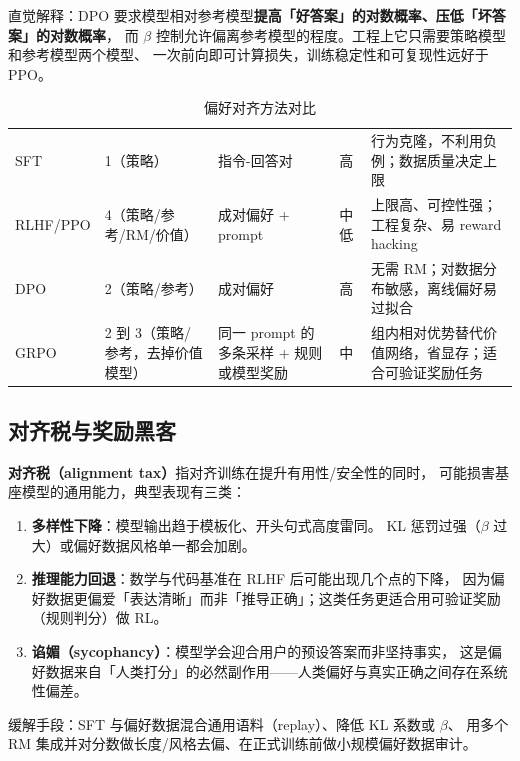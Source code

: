 直觉解释：DPO 要求模型相对参考模型\textbf{提高「好答案」的对数概率、压低「坏答案」的对数概率}，
而 $\beta$ 控制允许偏离参考模型的程度。工程上它只需要策略模型和参考模型两个模型、
一次前向即可计算损失，训练稳定性和可复现性远好于 PPO。

\begin{table}[htbp]
\centering
\caption{偏好对齐方法对比}
\label{tab:alignment-compare}
\small
\begin{tabularx}{\textwidth}{L{1.7cm} L{2.3cm} L{1.8cm} L{1.7cm} Y}
\toprule
{} &  &  &  &  \\
\midrule
SFT & 1（策略） & 指令-回答对 & 高 & 行为克隆，不利用负例；数据质量决定上限 \\
\addlinespace
RLHF/PPO & 4（策略/参考/RM/价值） & 成对偏好 + prompt & 中低 & 上限高、可控性强；工程复杂、易 reward hacking \\
\addlinespace
DPO & 2（策略/参考） & 成对偏好 & 高 & 无需 RM；对数据分布敏感，离线偏好易过拟合 \\
\addlinespace
GRPO & 2 到 3（策略/参考，去掉价值模型） & 同一 prompt 的多条采样 + 规则或模型奖励 & 中 & 组内相对优势替代价值网络，省显存；适合可验证奖励任务 \\
\bottomrule
\end{tabularx}
\end{table}

\subsection{对齐税与奖励黑客}

\begin{keypoint}[对齐不是免费的]
\textbf{对齐税（alignment tax）}指对齐训练在提升有用性/安全性的同时，
可能损害基座模型的通用能力，典型表现有三类：
\begin{enumerate}
  \item \textbf{多样性下降}：模型输出趋于模板化、开头句式高度雷同。
        KL 惩罚过强（$\beta$ 过大）或偏好数据风格单一都会加剧。
  \item \textbf{推理能力回退}：数学与代码基准在 RLHF 后可能出现几个点的下降，
        因为偏好数据更偏爱「表达清晰」而非「推导正确」；这类任务更适合用可验证奖励（规则判分）做 RL。
  \item \textbf{谄媚（sycophancy）}：模型学会迎合用户的预设答案而非坚持事实，
        这是偏好数据来自「人类打分」的必然副作用——人类偏好与真实正确之间存在系统性偏差。
\end{enumerate}
缓解手段：SFT 与偏好数据混合通用语料（replay）、降低 KL 系数或 $\beta$、
用多个 RM 集成并对分数做长度/风格去偏、在正式训练前做小规模偏好数据审计。
\end{keypoint}

